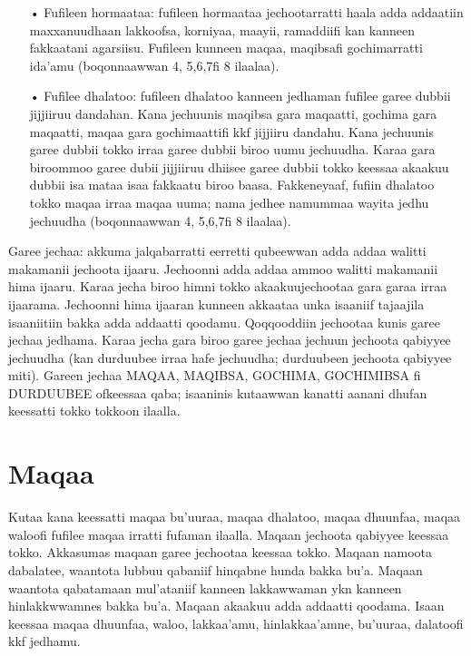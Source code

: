 \documentclass[11pt,b5paper]{book}
\begin{document}
\begin{itemize}
\begin{itemize}
\item[•] Fufileen hormaataa: fufileen hormaataa jechootarratti haala adda addaatiin maxxanuudhaan lakkoofsa, korniyaa, maayii, ramaddiifi kan kanneen fakkaatani agarsiisu. Fufileen kunneen maqaa, maqibsafi gochimarratti ida’amu (boqonnaawwan 4, 5,6,7fi 8 ilaalaa).

\item[•] Fufilee dhalatoo: fufileen dhalatoo kanneen jedhaman fufilee garee dubbii jijjiiruu dandahan. Kana jechuunis maqibsa gara maqaatti, gochima gara maqaatti, maqaa gara gochimaattifi kkf jijjiiru dandahu. Kana jechuunis garee dubbii tokko irraa garee dubbii biroo uumu jechuudha. Karaa gara biroommoo garee dubii jijjiiruu dhiisee garee dubbii tokko keessaa akaakuu dubbii isa mataa isaa fakkaatu biroo baasa. Fakkeneyaaf, fufiin dhalatoo tokko maqaa 
irraa maqaa uuma; nama jedhee namummaa wayita jedhu jechuudha (boqonnaawwan 4, 5,6,7fi 8 ilaalaa).
\end{itemize}

Garee jechaa: akkuma jalqabarratti eerretti qubeewwan adda addaa walitti makamanii jechoota ijaaru. Jechoonni adda addaa ammoo walitti makamanii hima ijaaru. Karaa jecha biroo himni tokko akaakuujechootaa gara garaa irraa ijaarama. Jechoonni hima ijaaran kunneen akkaataa unka isaaniif tajaajila isaaniitiin bakka adda addaatti qoodamu. Qoqqooddiin jechootaa kunis  garee jechaa jedhama. Karaa jecha gara biroo garee jechaa jechuun jechoota qabiyyee jechuudha (kan durduubee irraa hafe jechuudha; durduubeen jechoota qabiyyee miti). Gareen jechaa MAQAA, MAQIBSA, GOCHIMA, GOCHIMIBSA fi DURDUUBEE ofkeessaa qaba; isaaninis kutaawwan kanatti aanani dhufan keessatti tokko tokkoon ilaalla. 

\section{Maqaa}

Kutaa kana keessatti maqaa bu'uuraa, maqaa dhalatoo, maqaa dhuunfaa, maqaa waloofi fufilee maqaa irratti fufaman ilaalla. Maqaan jechoota qabiyyee keessaa tokko. Akkasumas maqaan garee jechootaa keessaa tokko. Maqaan namoota dabalatee, waantota lubbuu qabaniif hinqabne hunda bakka bu'a. Maqaan waantota qabatamaan mul'ataniif kanneen lakkawwaman ykn kanneen hinlakkwwamnes bakka bu’a. Maqaan akaakuu adda addaatti qoodama. Isaan keessaa maqaa dhuunfaa, waloo, lakkaa’amu, hinlakkaa’amne, bu’uuraa, dalatoofi kkf jedhamu. 


\end{itemize}
\end{document}
